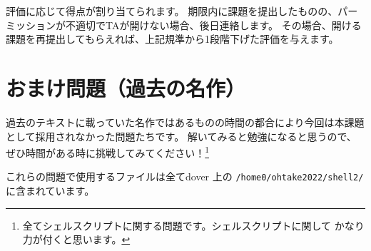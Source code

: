 \documentclass[a4j]{ltjreport}
\begin{document}
    評価に応じて得点が割り当てられます。
    期限内に課題を提出したものの、パーミッションが不適切でTAが開けない場合、後日連絡します。
    その場合、開ける課題を再提出してもらえれば、上記規準から1段階下げた評価を与えます。


    


    \chapter{おまけ問題（過去の名作）}

    過去のテキストに載っていた名作ではあるものの時間の都合により今回は本課題として採用されなかった問題たちです。
    解いてみると勉強になると思うので、
    ぜひ時間がある時に挑戦してみてください！\footnote{全てシェルスクリプトに関する問題です。シェルスクリプトに関して
    かなり力が付くと思います。}

    これらの問題で使用するファイルは全てdover 上の \verb+/home0/ohtake2022/shell2/+ に含まれています。


\end{document}
